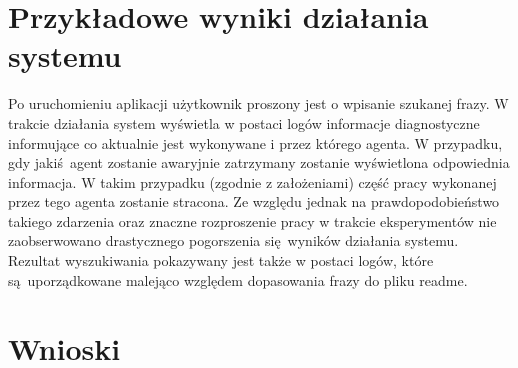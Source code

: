 \documentclass[12pt, oneside, final]{report}
\begin{document}
\section*{Przykładowe wyniki działania systemu}
Po uruchomieniu aplikacji użytkownik proszony jest o wpisanie szukanej frazy. W trakcie działania system wyświetla w postaci logów informacje diagnostyczne informujące co aktualnie jest wykonywane i przez którego agenta. W przypadku, gdy jakiś agent zostanie awaryjnie zatrzymany zostanie wyświetlona odpowiednia informacja. W takim przypadku (zgodnie z założeniami) część pracy wykonanej przez tego agenta zostanie stracona. Ze względu jednak na prawdopodobieństwo takiego zdarzenia oraz znaczne rozproszenie pracy w trakcie eksperymentów nie zaobserwowano drastycznego pogorszenia się wyników działania systemu. Rezultat wyszukiwania pokazywany jest także w postaci logów, które są uporządkowane malejąco względem dopasowania frazy do pliku readme.

\section*{Wnioski}
\end{document}
